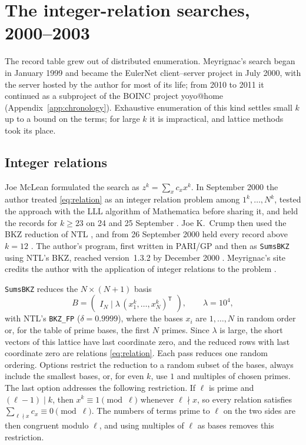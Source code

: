 \documentclass[11pt]{amsart}
\theoremstyle{definition}
\theoremstyle{remark}
\begin{document}
\section{The integer-relation searches, 2000--2003}\label{sec:history}

The record table grew out of distributed enumeration. Meyrignac's search began in January 1999
and became the EulerNet client--server project in July 2000, with the server hosted by the
author for most of its life; from 2010 to 2011 it continued as a subproject of the BOINC project
yoyo@home (Appendix~\ref{app:chronology}). Exhaustive enumeration of this kind settles small $k$ up to a bound on the terms; for large
$k$ it is impractical, and lattice methods took its place.

\subsection{Integer relations}
Joe McLean formulated the search as $z^k=\sum_x c_x x^k$. In September 2000 the author
treated \eqref{eq:relation} as an integer relation problem among $1^k,\dots,N^k$, tested the
approach with the LLL algorithm \cite{LLL1982} of Mathematica before sharing it, and held the
records for $k\ge23$ on 24 and 25 September \cite{MeyrignacEuler}. Joe K.~Crump then
used the BKZ reduction of NTL \cite{SchnorrEuchner1994,NTL}, and from 26 September 2000 held
every record above $k=12$ \cite{CrumpEqualSums2001}. The author's program, first written in PARI/GP and
then as \texttt{SumsBKZ} using NTL's BKZ, reached version~1.3.2 by December 2000
\cite{ChildersSumsPage2000}. Meyrignac's site credits the author with the application of integer relations
to the problem \cite{MeyrignacEuler}.

\texttt{SumsBKZ} reduces the $N\times(N+1)$ basis
\[
B=\begin{pmatrix} I_N \;\big|\; \lambda\,(x_1^k,\dots,x_N^k)^{\mathsf T}\end{pmatrix},\qquad \lambda=10^4,
\]
with NTL's \texttt{BKZ\_FP} ($\delta=0.9999$), where the bases $x_i$ are $1,\dots,N$ in random
order or, for the table of prime bases, the first $N$ primes. Since $\lambda$ is large, the
short vectors of this lattice have last coordinate zero, and the reduced rows with last
coordinate zero are relations \eqref{eq:relation}. Each pass reduces one random ordering. Options restrict the reduction to
a random subset of the bases, always include the smallest bases, or, for even $k$, use $1$
and multiples of chosen primes. The last option addresses the following restriction. If $\ell$
is prime and $(\ell-1)\mid k$, then $x^k\equiv1\pmod\ell$ whenever $\ell\nmid x$, so every
relation satisfies $\sum_{\ell\nmid x}c_x\equiv0\pmod\ell$. The numbers of terms prime to $\ell$
on the two sides are then congruent modulo $\ell$, and using multiples of $\ell$ as bases removes
this restriction.
\end{document}
